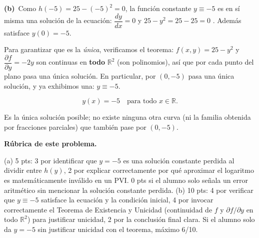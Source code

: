 \documentclass[11pt,letterpaper]{article}
\newcommand{\subparte}[2]{%
  \medskip\noindent\textbf{(#1}\ #2\par\smallskip
}
\newenvironment{resultado}
  {\begin{mdframed}[linecolor=black,linewidth=0.6pt,
    innerleftmargin=6pt,innerrightmargin=6pt,innertopmargin=4pt,innerbottommargin=4pt]
   \bfseries}
  {\end{mdframed}}
\newenvironment{rubrica}{%
  \begin{mdframed}[linecolor=black,linewidth=0.6pt,
    innerleftmargin=8pt,innerrightmargin=8pt,innertopmargin=5pt,innerbottommargin=5pt]
  \small\textbf{Rúbrica de este problema.}\par\smallskip
}{\end{mdframed}}
\begin{document}
\subparte{b)}{Como $h(-5)=25-(-5)^2=0$, la función constante $y\equiv -5$ es en sí misma una solución de la ecuación: $\dfrac{dy}{dx}=0$ y $25-y^2=25-25=0$ \checkmark. Además satisface $y(0)=-5$.

Para garantizar que es la \emph{única}, verificamos el teorema: $f(x,y)=25-y^2$ y $\dfrac{\partial f}{\partial y}=-2y$ son continuas en \textbf{todo} $\mathbb{R}^2$ (son polinomios), así que por cada punto del plano pasa una única solución. En particular, por $(0,-5)$ pasa una única solución, y ya exhibimos una: $y\equiv-5$.
\begin{resultado}
\[
y(x) = -5 \quad \text{para todo } x \in \mathbb{R}.
\]
\end{resultado}
Es la única solución posible; no existe ninguna otra curva (ni la familia obtenida por fracciones parciales) que también pase por $(0,-5)$.}

\begin{rubrica}
(a) 5 pts: 3 por identificar que $y=-5$ es una solución constante perdida al dividir entre $h(y)$, 2 por explicar correctamente por qué aproximar el logaritmo es matemáticamente inválido en un PVI. 0 pts si el alumno solo señala un error aritmético sin mencionar la solución constante perdida. (b) 10 pts: 4 por verificar que $y\equiv-5$ satisface la ecuación y la condición inicial, 4 por invocar correctamente el Teorema de Existencia y Unicidad (continuidad de $f$ y $\partial f/\partial y$ en todo $\mathbb{R}^2$) para justificar unicidad, 2 por la conclusión final clara. Si el alumno solo da $y=-5$ sin justificar unicidad con el teorema, máximo 6/10.
\end{rubrica}
\end{document}
